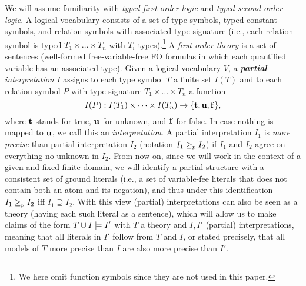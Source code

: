 We will assume familiarity with \emph{typed first-order logic} and \emph{typed second-order logic}.  
A logical vocabulary consists of a set of type symbols, typed constant symbols, and relation symbols with associated type signature (i.e., each relation symbol is typed $T_1\times \dots \times T_n$ with $T_i$ types).\footnote{We here omit function symbols since they are not used in this paper.}
A \emph{first-order theory} is a set of sentences (well-formed free-variable-free FO formulas in which each quantified variable has an associated type). 
Given a logical vocabulary $V$, a \emph{\textbf{partial} interpretation} $I$ assigns to each type symbol $T$ a finite set $I(T)$ and to each 
relation symbol $P$ with type signature $T_1\times \dots \times T_n$ a function 
\[I(P): I(T_1)\times \dots \times I(T_n)\to \{\mathbf{t},\mathbf{u},\mathbf{f}\},\] 
where $\mathbf{t}$ stands for true, $\mathbf{u}$ for unknown, and $\mathbf{f}$ for false. In case nothing is mapped to $\mathbf{u}$, we call this an \emph{interpretation}.
A partial interpretation $I_1$ is \emph{more precise} than partial interpretation $I_2$ (notation $I_1\geq_p I_2$) if $I_1$ and $I_2$ agree on everything no unknown in $I_2$.
From now on, since we will work in the context of a given and fixed finite domain, we will identify a partial structure with a consistent set of ground literals (i.e., a set of variable-fee literals that does not contain both an atom and its negation), and thus under this identification $I_1\geq_p I_2$ iff $I_1\supseteq I_2$.
With this view (partial) interpretations can also be seen as a theory (having each such literal as a sentence), which will allow us to make claims of the form 
$T\cup I \models I'$ with $T$ a theory and  $I,I'$ (partial) interpretations, meaning that all literals in $I'$ follow from $T$ and $I$, or stated precisely, that all models of $T$ more precise than $I$ are also more precise than $I'$. 
% 
